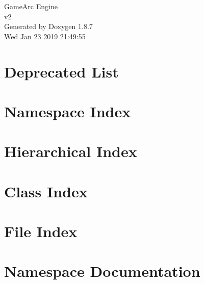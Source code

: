 \documentclass[twoside]{book}
\newcommand{\+}{\discretionary{\mbox{\scriptsize$\hookleftarrow$}}{}{}}
\newcommand{\clearemptydoublepage}{%
  \newpage{\pagestyle{empty}\cleardoublepage}%
}
\begin{document}
\hypersetup{pageanchor=false,
             bookmarks=true,
             bookmarksnumbered=true,
             pdfencoding=unicode
            }
\begin{titlepage}
\vspace*{7cm}
\begin{center}%
{\Large Game\+Arc Engine \\[1ex]\large v2 }\\
\vspace*{1cm}
{\large Generated by Doxygen 1.8.7}\\
\vspace*{0.5cm}
{\small Wed Jan 23 2019 21:49:55}\\
\end{center}
\end{titlepage}
\clearemptydoublepage
\tableofcontents
\clearemptydoublepage
{}
\hypersetup{pageanchor=true}

\chapter{Deprecated List}
\label{deprecated}
\hypertarget{deprecated}{}

\chapter{Namespace Index}

\chapter{Hierarchical Index}

\chapter{Class Index}

\chapter{File Index}

\chapter{Namespace Documentation}

\end{document}
